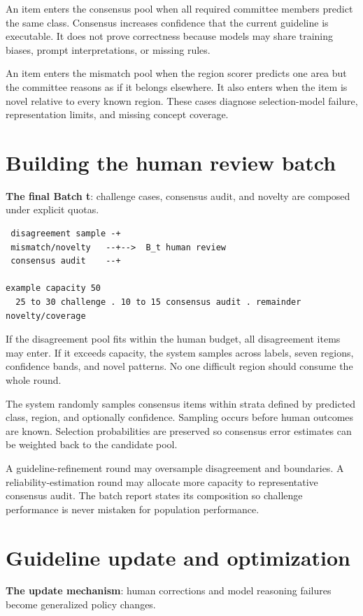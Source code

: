 An item enters the consensus pool when all required committee members predict the same class. Consensus increases confidence that the current guideline is executable. It does not prove correctness because models may share training biases, prompt interpretations, or missing rules.

An item enters the mismatch pool when the region scorer predicts one area but the committee reasons as if it belongs elsewhere. It also enters when the item is novel relative to every known region. These cases diagnose selection-model failure, representation limits, and missing concept coverage.


\section{Building the human review batch}
\textbf{The final Batch t}: challenge cases, consensus audit, and novelty are composed under explicit quotas.

\begin{verbatim}
 disagreement sample -+
 mismatch/novelty   --+-->  B_t human review
 consensus audit    --+

example capacity 50
  25 to 30 challenge . 10 to 15 consensus audit . remainder novelty/coverage
\end{verbatim}
If the disagreement pool fits within the human budget, all disagreement items may enter. If it exceeds capacity, the system samples across labels, seven regions, confidence bands, and novel patterns. No one difficult region should consume the whole round.

The system randomly samples consensus items within strata defined by predicted class, region, and optionally confidence. Sampling occurs before human outcomes are known. Selection probabilities are preserved so consensus error estimates can be weighted back to the candidate pool.

A guideline-refinement round may oversample disagreement and boundaries. A reliability-estimation round may allocate more capacity to representative consensus audit. The batch report states its composition so challenge performance is never mistaken for population performance.


\section{Guideline update and optimization}
\textbf{The update mechanism}: human corrections and model reasoning failures become generalized policy changes.

